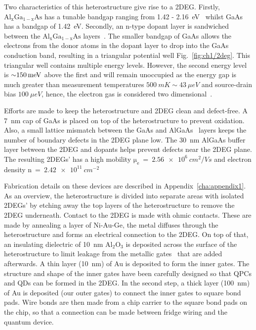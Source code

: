 Two characteristics of this heterostructure give rise to a 2DEG. Firstly, $\mathrm{Al_xGa_{1-x}As}$ has a tunable bandgap ranging from 1.42 - \qty{2.16}{eV}~\cite{gaas_overview} whilst GaAs has a bandgap of \qty{1.42}{eV}. Secondly, an n-type dopant layer is sandwiched between the $\mathrm{Al_xGa_{1-x}As}$ layers~\cite{dopant_layer}. The smaller bandgap of GaAs allows the electrons from the donor atoms in the dopant layer to drop into the GaAs conduction band, resulting in a triangular potential well Fig.~\ref{fig:ch1/2deg}. This triangular well contains multiple energy levels. However, the second energy level is $\qty{\sim 150}{meV}$ above the first and will remain unoccupied as the energy gap is much greater than measurement temperatures $\qty{500}{mK}\sim\qty{43}{\mu eV}$ and source-drain bias $\qty{100}{\mu eV}$, hence, the electron gas is considered two dimensional~\cite{BEENAKKER_1991}.

Efforts are made to keep the heterostructure and 2DEG clean and defect-free. A \qty{7}{nm} cap of GaAs is placed on top of the heterostructure to prevent oxidation. Also, a small lattice mismatch between the GaAs and AlGaAs~\cite{gaas_superlattice} layers keeps the number of boundary defects in the 2DEG plane low. The \qty{30}{nm} AlGaAs buffer layer between the 2DEG and dopants helps prevent defects near the 2DEG plane. The resulting 2DEGs' has a high mobility $\mathrm{\mu_e}~=~\qty{2.56e6}{cm^2/Vs}$ and electron density $\mathrm{n}~=~\qty{2.42e11}{cm^{-2}}$

Fabrication details on these devices are described in Appendix~\ref{cha:appendix1}. As an overview, the heterostructure is divided into separate areas with isolated 2DEGs' by etching away the top layers of the heterostructure to remove the 2DEG underneath. Contact to the 2DEG is made with ohmic contacts. These are made by annealing a layer of Ni-Au-Ge, the metal diffuses through the heterostructure and forms an electrical connection to the 2DEG. On top of that, an insulating dielectric of \qty{10}{nm} $\mathrm{Al_2O_3}$ is deposited across the surface of the heterostructure to limit leakage from the metallic gates~\cite{insulating_gates} that are added afterwards. A thin layer (\qty{10}{nm}) of Au is deposited to form the inner gates. The structure and shape of the inner gates have been carefully designed so that QPCs and QDs can be formed in the 2DEG. In the second step, a thick layer (\qty{100}{nm}) of Au is deposited (our outer gates) to connect the inner gates to square bond pads. Wire bonds are then made from a chip carrier to the square bond pads on the chip, so that a connection can be made between fridge wiring and the quantum device. 




